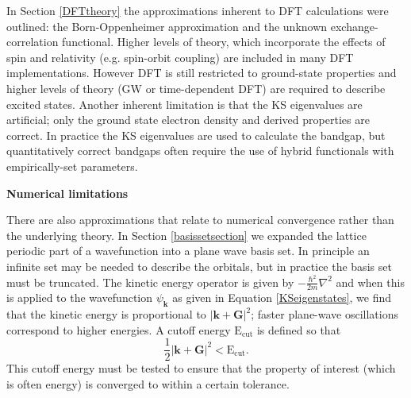 In Section \ref{DFTtheory} the approximations inherent to DFT calculations were outlined: the Born-Oppenheimer approximation and the unknown exchange-correlation functional. Higher levels of theory, which incorporate the effects of spin and relativity (e.g. spin-orbit coupling) are included in many DFT implementations. However DFT is still restricted to ground-state properties and higher levels of theory (GW or time-dependent DFT) are required to describe excited states. Another inherent limitation is that the KS eigenvalues are artificial; only the ground state electron density and derived properties are correct. In practice the KS eigenvalues are used to calculate the bandgap, but quantitatively correct bandgaps often require the use of hybrid functionals with empirically-set parameters.

\textbf{Numerical limitations} 

There are also approximations that relate to numerical convergence rather than the underlying theory.
In Section \ref{basissetsection} we expanded the lattice periodic part of a wavefunction into a plane wave basis set. In principle an infinite set may be needed to describe the orbitals, but in practice the basis set must be truncated. The kinetic energy operator is given by $-\frac{\hbar^2 }{2m}\nabla^2$ and when this is applied to the wavefunction $\psi_\mathbf{k}$ as given in Equation \ref{KSeigenstates}, we find that the kinetic energy is proportional to $|\mathbf{k}+\mathbf{G}|^2$; faster plane-wave oscillations correspond to higher energies. A cutoff energy $\textrm{E}_\textrm{cut}$ is defined so that
\begin{equation}
\frac{1}{2}|\mathbf{k}+\mathbf{G}|^2 < \textrm{E}_\textrm{cut}.
\end{equation}
This cutoff energy must be tested to ensure that the property of interest (which is often energy) is converged to within a certain tolerance.

